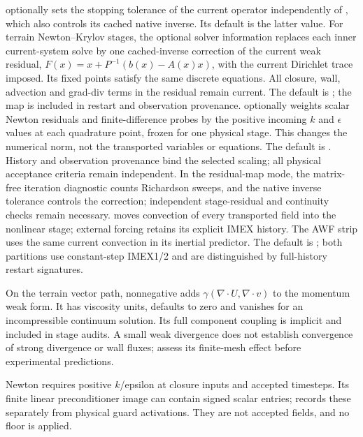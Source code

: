  optionally sets the stopping tolerance of the
current operator independently of , which also
controls its cached native inverse. Its default is the latter value.
For terrain Newton--Krylov stages, the optional solver information
 replaces each inner current-system
solve by one cached-inverse correction of the current weak residual,
$F(x)=x+P^{-1}(b(x)-A(x)x)$, with the current Dirichlet trace imposed.
Its fixed points satisfy the same discrete equations. All closure, wall,
advection and grad-div terms in the residual remain current. The default is
; the map is included in restart and observation provenance.
 optionally weights scalar Newton
residuals and finite-difference probes by the positive incoming $k$ and
$\epsilon$ values at each quadrature point, frozen for one physical stage.
This changes the numerical norm, not the transported variables or equations.
The default is . History and observation provenance bind
the selected scaling; all physical acceptance criteria remain independent.
In the residual-map mode, the matrix-free iteration diagnostic counts
Richardson sweeps, and the native inverse tolerance controls the correction;
independent stage-residual and continuity checks remain necessary.
 moves convection of every transported
field into the nonlinear stage; external forcing retains its explicit IMEX
history. The AWF strip uses the same current convection in its inertial
predictor. The default is ; both partitions use constant-step
IMEX1/2 and are distinguished by full-history restart signatures.

On the terrain vector path, nonnegative  adds
$\gamma(\nabla\cdot U,\nabla\cdot v)$ to the momentum weak form. It has viscosity
units, defaults to zero and vanishes for an incompressible continuum solution.
Its full component coupling is implicit and included in stage audits. A small
weak divergence does not establish convergence of strong divergence or wall
fluxes; assess its finite-mesh effect before experimental predictions.

Newton requires positive $k$/epsilon at closure inputs and accepted timesteps.
Its finite linear preconditioner image can contain signed scalar entries;
 records these separately from physical
guard activations. They are not accepted fields, and no floor is applied.


